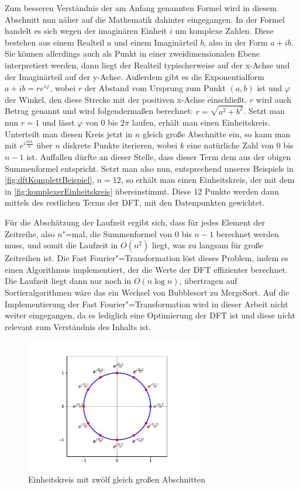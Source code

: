 Zum besseren Verständnis der am Anfang genannten Formel wird in diesem Abschnitt nun näher auf die Mathematik dahinter eingegangen. In der Formel handelt es sich wegen der imaginären Einheit $i$ um komplexe Zahlen. Diese bestehen aus einem Realteil $a$ und einem Imaginärteil $b$, also in der Form $a + ib$. Sie können allerdings auch als Punkt in einer zweidimensionalen Ebene interpretiert werden, dann liegt der Realteil typischerweise auf der x-Achse und der Imaginärteil auf der y-Achse. Außerdem gibt es die Exponentialform $a+ib=re^{i\varphi}$, wobei $r$ der Abstand vom Ursprung zum Punkt $(a,b)$ ist und $\varphi$ der Winkel, den diese Strecke mit der positiven x-Achse einschließt. $r$ wird auch Betrag genannt und wird folgendermaßen berechnet: $r=\sqrt{a^2+b^2}$. Setzt man nun $r=1$ und lässt $\varphi$ von 0 bis $2\pi$ laufen, erhält man einen Einheitskreis. Unterteilt man diesen Kreis jetzt in $n$ gleich große Abschnitte ein, so kann man mit $e^{i\frac{2\pi k}{n}}$ über $n$ diskrete Punkte iterieren, wobei $k$ eine natürliche Zahl von 0 bis $n-1$ ist. Auffallen dürfte an dieser Stelle, dass dieser Term dem aus der obigen Summenformel entspricht. Setzt man also nun, entsprechend unseres Beispiels in \autoref{fig:dftKomplettBeispiel}, $n=12$, so erhält man einen Einheitskreis, der mit dem in \autoref{fig:komplexerEinheitskreis} übereinstimmt. Diese 12 Punkte werden dann mittels des restlichen Terms der \acs{DFT}, mit den Datenpunkten gewichtet.

Für die Abschätzung der Laufzeit ergibt sich, dass für jedes Element der Zeitreihe, also $n$"=mal, die Summenformel von 0 bis $n-1$ berechnet werden muss, und somit die Laufzeit in $O(n^2)$ liegt, was zu langsam für große Zeitreihen ist. Die Fast Fourier"=Transformation löst dieses Problem, indem es einen Algorithmus implementiert, der die Werte der \acs{DFT} effizienter berechnet. Die Laufzeit liegt dann nur noch in $O(n\log n)$, übertragen auf Sortieralgorithmen wäre das ein Wechsel von Bubblesort zu MergeSort. Auf die Implementierung der Fast Fourier"=Transformation wird in dieser Arbeit nicht weiter eingegangen, da es lediglich eine Optimierung der \acs{DFT} ist und diese nicht relevant zum Verständnis des Inhalts ist.
\begin{figure}[bth] 
  \centering
  \includegraphics[width=0.7\textwidth]{Graphics/KomplexerEinheitskreis.pdf}
  \caption{Einheitskreis mit zwölf gleich großen Abschnitten}
  \label{fig:komplexerEinheitskreis}
\end{figure}


